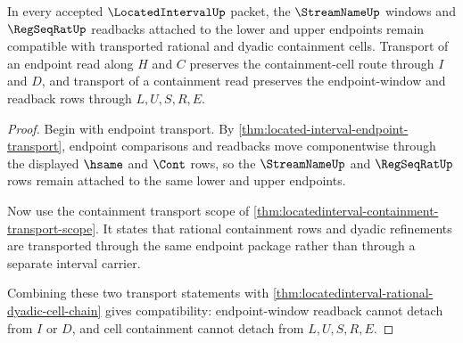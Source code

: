 \begin{theorem}
\label{thm:locatedinterval-stream-readback-cell-compatibility}
In every accepted $\LocatedIntervalUp$ packet, the $\StreamNameUp$ windows and $\RegSeqRatUp$ readbacks attached to the lower and upper endpoints remain compatible with transported rational and dyadic containment cells. Transport of an endpoint read along $H$ and $C$ preserves the containment-cell route through $I$ and $D$, and transport of a containment read preserves the endpoint-window and readback rows through $L,U,S,R,E$.
\end{theorem}
\begin{proof}
Begin with endpoint transport. By \autoref{thm:located-interval-endpoint-transport}, endpoint comparisons and readbacks move componentwise through the displayed $\hsame$ and $\Cont$ rows, so the $\StreamNameUp$ and $\RegSeqRatUp$ rows remain attached to the same lower and upper endpoints.

Now use the containment transport scope of \autoref{thm:locatedinterval-containment-transport-scope}. It states that rational containment rows and dyadic refinements are transported through the same endpoint package rather than through a separate interval carrier.

Combining these two transport statements with \autoref{thm:locatedinterval-rational-dyadic-cell-chain} gives compatibility: endpoint-window readback cannot detach from $I$ or $D$, and cell containment cannot detach from $L,U,S,R,E$.
\end{proof}

